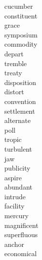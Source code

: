 \documentclass[a4paper, 11pt]{ctexart}
\begin{document}
\begin{multicols*}{3}
\begin{description}
\item[cucumber]

\item[constituent]

\item[grace]

\item[symposium]

\item[commodity]

\item[depart]

\item[tremble]

\item[treaty]

\item[disposition]

\item[distort]

\item[convention]

\item[settlement]

\item[alternate]

\item[poll]

\item[tropic]

\item[turbulent]

\item[jaw]

\item[publicity]

\item[aspire]

\item[abundant]

\item[intrude]

\item[facility]

\item[mercury]

\item[magnificent]

\item[superfluous]

\item[anchor]

\item[economical]


\end{description}
\end{multicols*}
\end{document}
